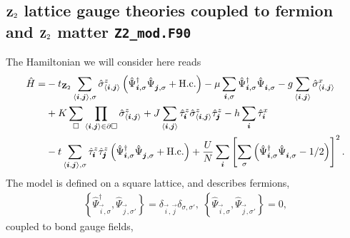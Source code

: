 

\subsection{$\mathbf{Z}_{2}$ lattice gauge theories coupled to fermion and $\mathbf{Z}_{2}$ matter  \texttt{Z2\_mod.F90}} \label{Z2.Sec}

The Hamiltonian we will consider here reads
\begin{align}
	\hat{H} =& -  t_{\Ztwo} \sum_{\langle \vec{i}, \vec{j} \rangle, \sigma } \hat{\sigma}^z_{\langle \vec{i}, \vec{j} \rangle}
	\left(\hat{\Psi}^{\dagger}_{\vec{i},\sigma} \hat{\Psi}^{\phantom{\dagger}}_{\vec{j},\sigma}   + \hc \right) - \mu \sum_{\vec{i},\sigma} \hat{\Psi}^{\dagger}_{\vec{i},\sigma} \hat{\Psi}^{\phantom{\dagger}}_{\vec{i},\sigma}  
	-g \sum_{\langle \vec{i}, \vec{j} \rangle } \hat{\sigma}^{x}_{\langle \vec{i}, \vec{j} \rangle } \nonumber \\
	  & +K \sum_{\square} \prod_{\langle \vec{i}, \vec{j} \rangle \in \partial \square} \hat{\sigma}^{z}_{\langle \vec{i}, \vec{j} \rangle}  
	 + J  \sum_{\langle \vec{i}, \vec{j} \rangle}  \hat{\tau}^z_{\pmb{i}}  \hat{\sigma}^{z}_{\langle \vec{i}, \vec{j} \rangle} \hat{\tau}^z_{\pmb{j}}   
	      -  h \sum_{ \vec{i} } \hat{\tau}^x_{\vec{i}} \nonumber \\
	& - t  \sum_{\langle \vec{i}, \vec{j} \rangle, \sigma }   \hat{\tau}^z_{\pmb{i}}   \hat{\tau}^z_{\pmb{j}}  \left( \hat{\Psi}^{\dagger}_{\vec{i},\sigma} \hat{\Psi}^{\phantom{\dagger}}_{\vec{j},\sigma} 	+ \hc \right) + \frac{U}{N}\sum_{\ve{i}} \left[ \sum_{\sigma}  \left( \hat{\Psi}^{\dagger}_{\ve{i},\sigma}  \hat{\Psi}^{\phantom\dagger}_{\ve{i},\sigma} - 1/2\right) \right]^2.
\end{align}  
The model is defined on a square lattice, and describes  fermions, 
\begin{align}
 \left\{ \hat{\Psi}^{\dagger}_{\vec{i},\sigma},  \hat{\Psi}^{\phantom\dagger}_{\vec{j},\sigma'} \right\}  = \delta_{\vec{i},\vec{j}} \delta_{\sigma,\sigma'}, \;  
\left\{ \hat{\Psi}^{\phantom\dagger}_{\vec{i},\sigma},  \hat{\Psi}^{\phantom\dagger}_{\vec{j},\sigma'} \right\}  =  0,  
\end{align}
coupled to  bond gauge fields, 
